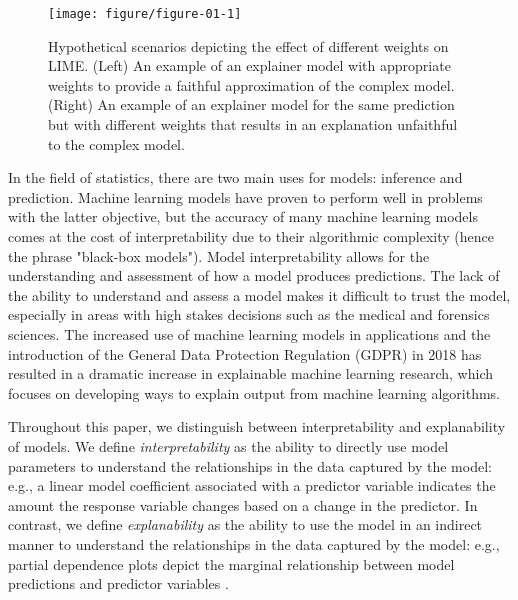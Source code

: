 \documentclass[AMS,STIX2COL]{WileyNJD-v2}\usepackage[]{graphicx}\usepackage[]{color}
\newenvironment{knitrout}{}{} %
\begin{document}
\begin{figure}[!thp]
\begin{knitrout}
\color{fgcolor}

{\centering \texttt{[image: figure/figure-01-1]} 

}


\end{knitrout}
\caption{Hypothetical scenarios depicting the effect of different weights on LIME. (Left) An example of an explainer model with appropriate weights to provide a faithful approximation of the complex model. (Right) An example of an explainer model for the same prediction but with different weights that results in an explanation unfaithful to the complex model.}
\label{fig:figure-01}
\end{figure}

In the field of statistics, there are two main uses for models: inference and prediction. Machine learning models have proven to perform well in problems with the latter objective, but the accuracy of many machine learning models comes at the cost of interpretability due to their algorithmic complexity (hence the phrase "black-box models"). Model interpretability allows for the understanding and assessment of how a model produces predictions. The lack of the ability to understand and assess a model makes it difficult to trust the model, especially in areas with high stakes decisions such as the medical and forensics sciences. The increased use of machine learning models in applications and the introduction of the General Data Protection Regulation (GDPR) in 2018 \citep{goodman:2016} has resulted in a dramatic increase in explainable machine learning research, which focuses on developing ways to explain output from machine learning algorithms.

Throughout this paper, we distinguish between interpretability and explanability of models. We define {\it interpretability} as the ability to directly use model parameters to understand the relationships in the data captured by the model: e.g., a linear model coefficient associated with a predictor variable indicates the amount the response variable changes based on a change in the predictor. In contrast, we define {\it explanability} as the ability to use the model in an indirect manner to understand the relationships in the data captured by the model: e.g., partial dependence plots depict the marginal relationship between model predictions and predictor variables \citep{friedman:2001}.
\end{document}
